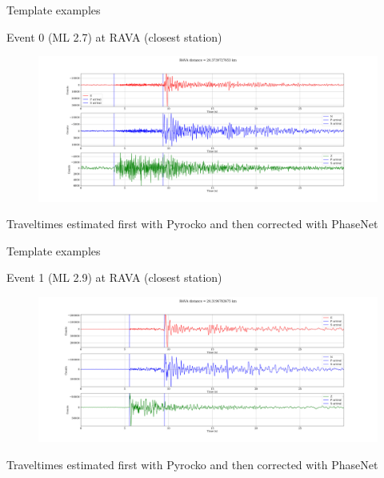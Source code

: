 \documentclass[aspectratio=43,9pt]{beamer}
\begin{document}
\begin{frame}{Template examples}

\centering Event 0 (ML 2.7) at RAVA (closest station)
\begin{figure}
 \includegraphics[width=1\linewidth]{figs/event_0_RAVA.png}
\end{figure}

Traveltimes estimated first with Pyrocko and then corrected with PhaseNet

\end{frame}


\begin{frame}{Template examples}

\centering Event 1 (ML 2.9) at RAVA (closest station)
\begin{figure}
 \includegraphics[width=1\linewidth]{figs/event_1_RAVA.png}
\end{figure}

Traveltimes estimated first with Pyrocko and then corrected with PhaseNet

\end{frame}
\end{document}
